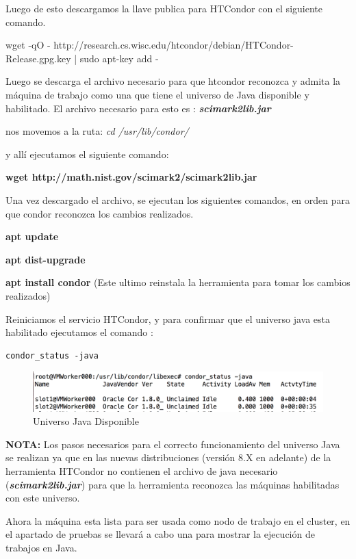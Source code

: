 Luego de esto descargamos la llave publica para HTCondor con el siguiente comando.

wget -qO - http://research.cs.wisc.edu/htcondor/debian/HTCondor-Release.gpg.key | sudo apt-key add -

Luego se descarga el archivo necesario para que htcondor reconozca y admita la máquina de trabajo como una que tiene el universo de Java disponible y habilitado. El archivo necesario para esto es : \textbf{\textit{scimark2lib.jar}}

nos movemos a la ruta: \textit{cd /usr/lib/condor/}

y allí ejecutamos el siguiente comando:

\textbf{wget http://math.nist.gov/scimark2/scimark2lib.jar}

Una vez descargado el archivo, se ejecutan los siguientes comandos, en orden para que condor reconozca los cambios realizados.

\textbf{apt update}

\textbf{apt dist-upgrade}

\textbf{apt install condor} (Este ultimo reinstala la herramienta para tomar los cambios realizados)

Reiniciamos el servicio HTCondor, y para confirmar que el universo java esta habilitado ejecutamos el comando :

\begin{lstlisting}
condor_status -java
\end{lstlisting} 
\begin{figure}[h]
\centering
\includegraphics[width=1\textwidth]{Figures/javaready.png}
\decoRule
\caption{Universo Java Disponible }
\label{fig:Java Universe}
\end{figure}
\FloatBarrier

\textbf{NOTA:} Los pasos necesarios para el correcto funcionamiento del universo Java se realizan ya que en las nuevas distribuciones (versión 8.X en adelante) de la herramienta HTCondor no contienen el archivo de java necesario (\textbf{\textit{scimark2lib.jar}}) para que la herramienta reconozca las máquinas habilitadas con este universo.

Ahora la máquina esta lista para ser usada como nodo de trabajo en el cluster, en el apartado de pruebas se llevará a cabo una para mostrar la ejecución de trabajos en Java.


